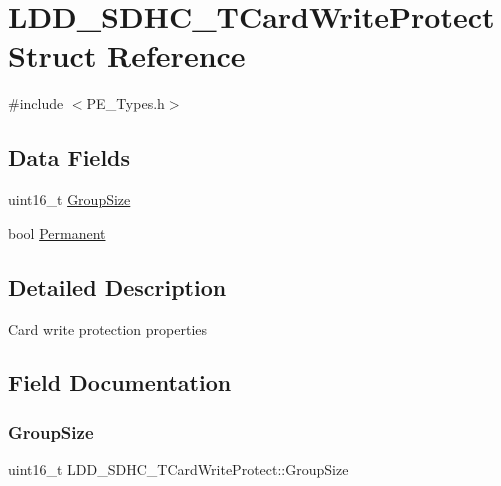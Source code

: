 \hypertarget{struct_l_d_d___s_d_h_c___t_card_write_protect}{}\section{L\+D\+D\+\_\+\+S\+D\+H\+C\+\_\+\+T\+Card\+Write\+Protect Struct Reference}
\label{struct_l_d_d___s_d_h_c___t_card_write_protect}


{\ttfamily \#include $<$P\+E\+\_\+\+Types.\+h$>$}

\subsection*{Data Fields}
\begin{DoxyCompactItemize}
\item 
uint16\+\_\+t \hyperlink{struct_l_d_d___s_d_h_c___t_card_write_protect_ae05b5dd538cf47f5ec24559246415306}{Group\+Size}
\item 
bool \hyperlink{struct_l_d_d___s_d_h_c___t_card_write_protect_aff6b0178087c770234bd68974d643552}{Permanent}
\end{DoxyCompactItemize}


\subsection{Detailed Description}
Card write protection properties 

\subsection{Field Documentation}
\mbox{\label{struct_l_d_d___s_d_h_c___t_card_write_protect_ae05b5dd538cf47f5ec24559246415306}} 
\subsubsection{\texorpdfstring{Group\+Size}{GroupSize}}
{\footnotesize\ttfamily uint16\+\_\+t L\+D\+D\+\_\+\+S\+D\+H\+C\+\_\+\+T\+Card\+Write\+Protect\+::\+Group\+Size}

